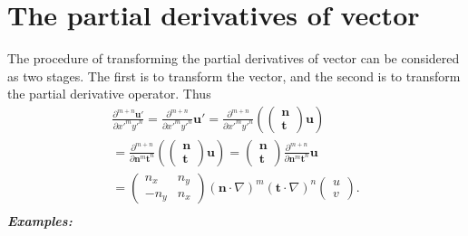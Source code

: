 \documentclass[review]{elsarticle}
\begin{document}
\section{The partial derivatives of vector}
The procedure of transforming the partial derivatives of vector can be considered as two stages. The first is to transform the vector, and the second is to transform the partial derivative operator. Thus
\begin{equation}\label{dmndx'mdy'n:vector}
	\begin{gathered}
		\frac{\partial^{m+n}\bm{u}'}{\partial x'^my'^n} = \frac{\partial^{m+n}}{\partial x'^my'^n}\bm{u}'
		=\frac{\partial^{m+n}}{\partial x'^my'^n}\left(\left(
				\begin{array}{c} \bm{n} \\ \bm{t}		\end{array}
			\right)\bm{u}\right)\\
		=\frac{\partial^{m+n}}{\partial \bm{n}^m\bm{t}^n}\left(\left(
				\begin{array}{c} \bm{n} \\ \bm{t}		\end{array}
			\right)\bm{u}\right)
		=\left(\begin{array}{c} \bm{n} \\ \bm{t} \end{array}\right)
		\frac{\partial^{m+n}}{\partial \bm{n}^m\bm{t}^n}\bm{u}\\
		=\left(\begin{array}{cc} n_x & n_y \\ -n_y & n_x \end{array}\right)
			\left(\bm{n}\cdot \nabla\right)^m\left(\bm{t}\cdot \nabla\right)^n
			\left(\begin{array}{c} u \\ v \end{array}\right). \\
	\end{gathered}
\end{equation}
\textit{\textbf{Examples:}}\\
\end{document}
